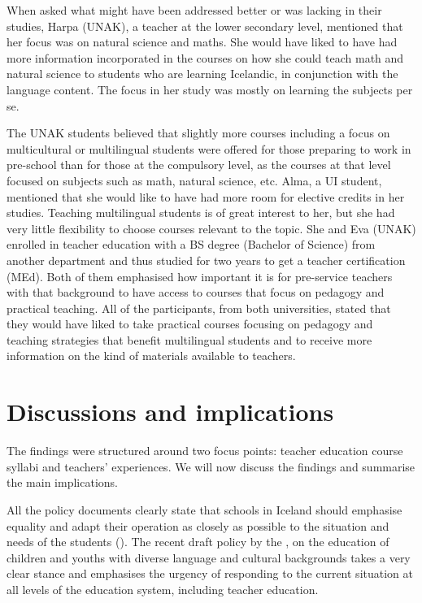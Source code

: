 \documentclass[output=paper]{langscibook}
\begin{document}
When asked what might have been addressed better or was lacking in their studies, Harpa (UNAK), a teacher at the lower secondary level, mentioned that her focus was on natural science and maths. She would have liked to have had more information incorporated in the courses on how she could teach math and natural science to students who are learning Icelandic, in conjunction with the language content. The focus in her study was mostly on learning the subjects per se.

The UNAK students believed that slightly more courses including a focus on multicultural or multilingual students were offered for those preparing to work in pre-school than for those at the compulsory level, as the courses at that level focused on subjects such as math, natural science, etc. Alma, a UI student, mentioned that she would like to have had more room for elective credits in her studies. Teaching multilingual students is of great interest to her, but she had very little flexibility to choose courses relevant to the topic. She and Eva (UNAK) enrolled in teacher education with a BS degree (Bachelor of Science) from another department and thus studied for two years to get a teacher certification (MEd). Both of them emphasised how important it is for pre-service teachers with that background to have access to courses that focus on pedagogy and practical teaching. All of the participants, from both universities, stated that they would have liked to take practical courses focusing on pedagogy and teaching strategies that benefit multilingual students and to receive more information on the kind of materials available to teachers.

\section{Discussions and implications}\label{sec:gunnþórsdóttir:6} %

The findings were structured around two focus points:  teacher education course syllabi and teachers’ experiences. We will now discuss the findings and summarise the main implications.

All the policy documents clearly state that schools in Iceland should emphasise equality and adapt their operation as closely as possible to the situation and needs of the students (\citealt{Ministry_of_education_science_and_culture2011}). The recent draft policy by the \citet{Ministry_of_education_science_and_culture2020-3}, on the education of children and youths with diverse language and cultural backgrounds takes a very clear stance and emphasises the urgency of responding to the current situation at all levels of the education system, including teacher education.
\end{document}
